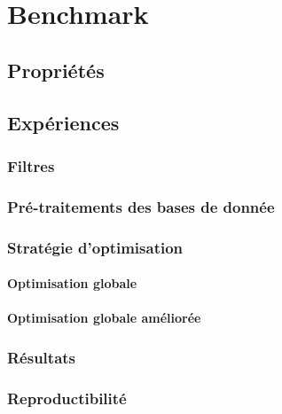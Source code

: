 %

\chapter{Benchmark}
\label{sec:Benchmark}


\section{Propriétés}
\label{sec:Benchmark}
\section{Expériences}
\label{sec:Benchmark:experiences}
\subsection{Filtres}
\label{sec:Filtres}
\subsection{Pré-traitements des bases de donnée}
\label{sec:Benchmark:traitement_des_données}
\subsection{Stratégie d'optimisation}
\label{sec:Benchmark:optimisation}
\subsubsection{Optimisation globale}
\label{sec:Benchmark:optimisation_globale}
\subsubsection{Optimisation globale améliorée}
\label{sec:Benchmark:optimisation_globale_ameliorée}
\subsection{Résultats}
\label{sec:Benchmark:résultats}
\subsection{Reproductibilité}
\label{sec:Benchmark:reproductibilité}